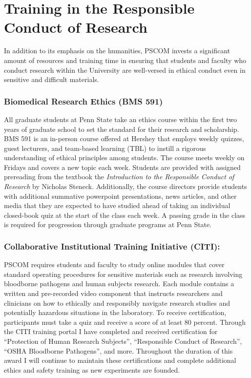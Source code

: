 \documentclass{NIHGrant}
\begin{document}
\part*{Training in the Responsible Conduct of Research}
In addition to its emphasis on the humanities, PSCOM invests a significant amount of resources and training time in ensuring that students and faculty who conduct research within the University are well-versed in ethical conduct even in sensitive and difficult materials.

\section*{Biomedical Research Ethics (BMS 591)}
All graduate students at Penn State take an ethics course within the first two years of graduate school to set the standard for their research and scholarship. BMS 591 is an in-person course offered at Hershey that employs weekly quizzes, guest lecturers, and team-based learning (TBL) to instill a rigorous understanding of ethical principles among students. The course meets weekly on Fridays and covers a new topic each week. Students are provided with assigned prereading from the textbook the \textit{Introduction to the Responsible Conduct of Research} by Nicholas Steneck. Additionally, the course directors provide students with additional summative powerpoint presentations, news articles, and other media that they are expected to have studied ahead of taking an individual closed-book quiz at the start of the class each week. A passing grade in the class is required for progression through graduate programs at Penn State.

\section*{Collaborative Institutional Training Initiative (CITI):}
PSCOM requires students and faculty to study online modules that cover standard operating procedures for sensitive materials such as research involving bloodborne pathogens and human subjects research. Each module contains a written and pre-recorded video component that instructs researchers and clinicians on how to ethically and responsibly navigate research studies and potentially hazardous situations in the laboratory. To receive certification, participants must take a quiz and receive a score of at least 80 percent. Through the CITI training portal I have completed and received certification for ``Protection of Human Research Subjects'', ``Responsible Conduct of Research'', ``OSHA Bloodborne Pathogens'', and more. Throughout the duration of this award I will continue to maintain these certifications and complete additional ethics and safety training as new experiments are founded.
\end{document}
